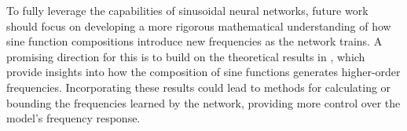 To fully leverage the capabilities of sinusoidal neural networks, future work should focus on developing a more rigorous mathematical understanding of how sine function compositions introduce new frequencies as the network trains. A promising direction for this is to build on the theoretical results in \cite{novello2022understanding}, which provide insights into how the composition of sine functions generates higher-order frequencies. Incorporating these results could lead to methods for calculating or bounding the frequencies learned by the network, providing more control over the model's frequency response.